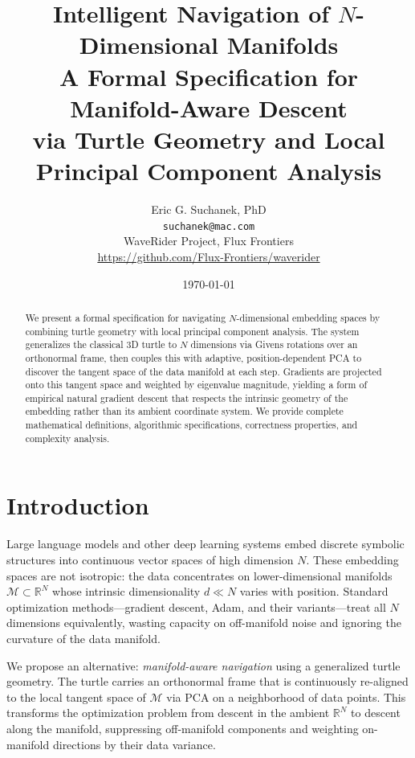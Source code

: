\documentclass[11pt,letterpaper]{article}
\title{%
  \textbf{Intelligent Navigation of $N$-Dimensional Manifolds} \\[6pt]
  \large A Formal Specification for Manifold-Aware Descent \\
  via Turtle Geometry and Local Principal Component Analysis
}
\author{
  Eric G. Suchanek, PhD \\
  \texttt{suchanek@mac.com} \\[4pt]
  WaveRider Project, Flux Frontiers \\
  \url{https://github.com/Flux-Frontiers/waverider}
}
\date{\today}
\newcommand{\R}{\mathbb{R}}
\newcommand{\manifold}{\mathcal{M}}
\begin{document}
\maketitle

\begin{abstract}
We present a formal specification for navigating $N$-dimensional embedding
spaces by combining turtle geometry with local principal component analysis.
The system generalizes the classical 3D turtle to $N$ dimensions via Givens
rotations over an orthonormal frame, then couples this with adaptive,
position-dependent PCA to discover the tangent space of the data manifold
at each step. Gradients are projected onto this tangent space and weighted
by eigenvalue magnitude, yielding a form of empirical natural gradient
descent that respects the intrinsic geometry of the embedding rather than
its ambient coordinate system. We provide complete mathematical definitions,
algorithmic specifications, correctness properties, and complexity analysis.
\end{abstract}

\tableofcontents
\newpage

\section{Introduction}
\label{sec:intro}

Large language models and other deep learning systems embed discrete
symbolic structures into continuous vector spaces of high dimension $N$.
These embedding spaces are not isotropic: the data concentrates on
lower-dimensional manifolds $\manifold \subset \R^N$ whose intrinsic
dimensionality $d \ll N$ varies with position. Standard optimization
methods---gradient descent, Adam, and their variants---treat all $N$
dimensions equivalently, wasting capacity on off-manifold noise and
ignoring the curvature of the data manifold.

We propose an alternative: \emph{manifold-aware navigation} using a
generalized turtle geometry. The turtle carries an orthonormal frame
that is continuously re-aligned to the local tangent space of $\manifold$
via PCA on a neighborhood of data points. This transforms the optimization
problem from descent in the ambient $\R^N$ to descent along the manifold,
suppressing off-manifold components and weighting on-manifold directions
by their data variance.
\end{document}
